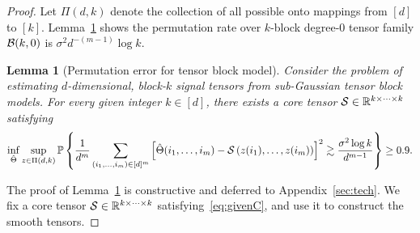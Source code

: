 \documentclass[11pt]{article}
\newtheorem{lem}{Lemma}
\theoremstyle{definition}
\begin{document}
\begin{proof}
Let $\Pi(d,k)$ denote the collection of all possible onto mappings from $[d]$ to $[k]$.
Lemma~\ref{lem:permutation} shows the permutation rate over  $k$-block degree-0 tensor family $\mathcal{B}(k,0)$ is $\sigma^2 d^{-(m-1)}\log k$. 
\begin{lem}[Permutation error for tensor block model]\label{lem:permutation}
Consider the problem of estimating $d$-dimensional, block-$k$ signal tensors from sub-Gaussian tensor block models.
For every given integer $k\in[d]$, there exists a core tensor $\mathcal{S}\in\mathbb{R}^{k\times \cdots \times k}$ satisfying
\begin{equation}\label{eq:givenC}
\inf_{\hat \Theta}\sup_{z \in \Pi(d,k)}\mathbb{P}\left\{{1\over d^m}\sum_{(i_1,\ldots,i_m)\in[d]^m}\left[\hat \Theta(i_1,\ldots,i_m)-\mathcal{S}\left(z(i_1),\ldots,z(i_m)\right)\right]^2\gtrsim \frac{\sigma^2\log k} {d^{m-1}}\right\}\geq 0.9.
\end{equation}
\end{lem}
The proof of Lemma~\ref{lem:permutation} is constructive and deferred to Appendix~\ref{sec:tech}. We fix a core tensor $\mathcal{S}\in\mathbb{R}^{k\times \cdots \times k}$ satisfying~\eqref{eq:givenC}, and use it to construct the smooth tensors. 


\end{proof}
\end{document}
